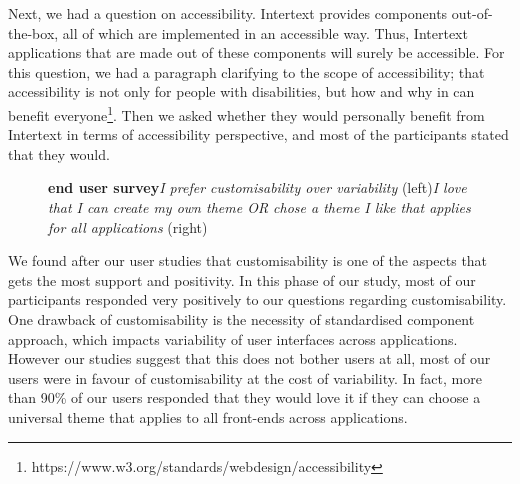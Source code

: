 Next, we had a question on accessibility. Intertext provides components out-of-the-box, all of which are implemented in an accessible way. Thus, Intertext applications that are made out of these components will surely be accessible. For this question, we had a paragraph clarifying to the scope of accessibility; that accessibility is not only for people with disabilities, but how and why in can benefit everyone\footnote{https://www.w3.org/standards/webdesign/accessibility}. Then we asked whether they would personally benefit from Intertext in terms of accessibility perspective, and most of the participants stated that they would.


\begin{figure}[H]
\centering
{}
\vspace*{-5mm}
\caption{\textbf{end user survey}\newline\textit{I prefer customisability over variability} (left)\newline\textit{I love that I can create my own theme OR chose a theme I like that applies for all applications} (right)} \label{fig:ev_p2_4}
\end{figure}

We found after our user studies that customisability is one of the aspects that gets the most support and positivity. In this phase of our study, most of our participants responded very positively to our questions regarding customisability. One drawback of customisability is the necessity of standardised component approach, which impacts variability of user interfaces across applications. However our studies suggest that this does not bother users at all, most of our users were in favour of customisability at the cost of variability. In fact, more than 90\% of our users responded that they would love it if they can choose a universal theme that applies to all front-ends across applications.


